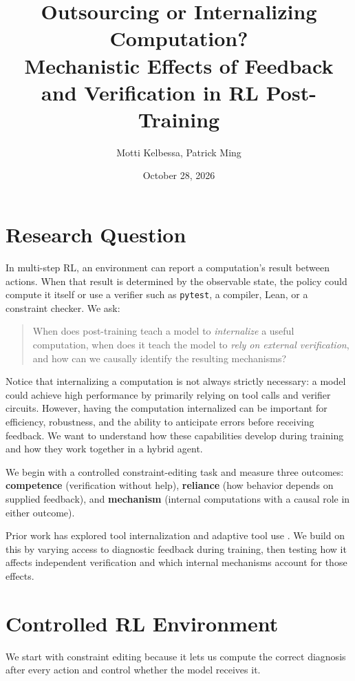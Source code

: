 \documentclass[11pt]{article}
\title{Outsourcing or Internalizing Computation?\\[-0.12em]
\large Mechanistic Effects of Feedback and Verification in RL Post-Training}
\author{Motti Kelbessa, Patrick Ming}
\date{October 28, 2026}
\begin{document}
\maketitle
\vspace{-1.1em}

\section{Research Question}
In multi-step RL, an environment can report a computation's result between actions. When that result is determined by the observable state, the policy could compute it itself or use a verifier such as \texttt{pytest}, a compiler, Lean, or a constraint checker. We ask:
\begin{quote}
  When does post-training teach a model to \emph{internalize} a useful computation, when does it teach the model to \emph{rely on external verification}, and how can we causally identify the resulting mechanisms?
\end{quote}

Notice that internalizing a computation is not always strictly necessary: a model could achieve high performance by primarily relying on tool calls and verifier circuits. However, having the computation internalized can be important for efficiency, robustness, and the ability to anticipate errors before receiving feedback. We want to understand how these capabilities develop during training and how they work together in a hybrid agent.

We begin with a controlled constraint-editing task and measure three outcomes: \textbf{competence} (verification without help), \textbf{reliance} (how behavior depends on supplied feedback), and \textbf{mechanism} (internal computations with a causal role in either outcome).

Prior work has explored tool internalization and adaptive tool use
\cite{xu2026tinr,li2025adaptive,paglieri2025plan}. We build on this by
varying access to diagnostic feedback during training, then testing how
it affects independent verification and which internal mechanisms
account for those effects.

\section{Controlled RL Environment}
We start with constraint editing because it lets us compute the correct diagnosis after every action and control whether the model receives it.
\end{document}
